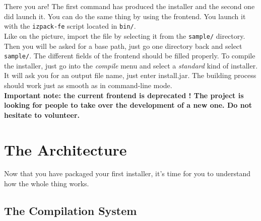 There you are! The first command has produced the installer and the
second one did launch it. You can do the same thing by using the
frontend. You launch it with the \texttt{izpack-fe} script located in
\texttt{bin/}.\\

Like on
the picture, import the file by selecting it from the \texttt{sample/}
directory. Then you will be asked for a base path, just go one directory
back and select \texttt{sample/}. The different fields of the frontend
should be filled properly. To compile the installer, just go into the
\textit{compile} menu and select a \textit{standard} kind of installer.
It will ask you for an output file name, just enter install.jar. The
building process should work just as smooth as in command-line mode.\\

\noindent
\textbf{Important note: the current frontend is deprecated ! The project is
looking for people to take over the development of a new one. Do not hesitate
to volunteer.}

\section{The \IzPack Architecture}

Now that you have packaged your first installer, it's time for you to understand
how the whole thing works.\\

\subsection{The Compilation System}

